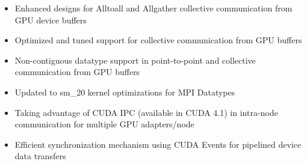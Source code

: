 \begin{itemize}
\begin{itemize}
      \item  Enhanced designs for Alltoall and Allgather collective 
           communication from GPU device buffers

      \item  Optimized and tuned support for collective communication from GPU buffers

      \item  Non-contiguous datatype support in point-to-point and collective
           communication from GPU buffers 
          
      \item  Updated to sm\_20 kernel optimizations for MPI Datatypes

      \item  Taking advantage of CUDA IPC (available in CUDA 4.1) in intra-node 
           communication for multiple GPU adapters/node

      \item  Efficient synchronization mechanism using CUDA Events for pipelined 
           device data transfers

    \end{itemize}




\end{itemize}

